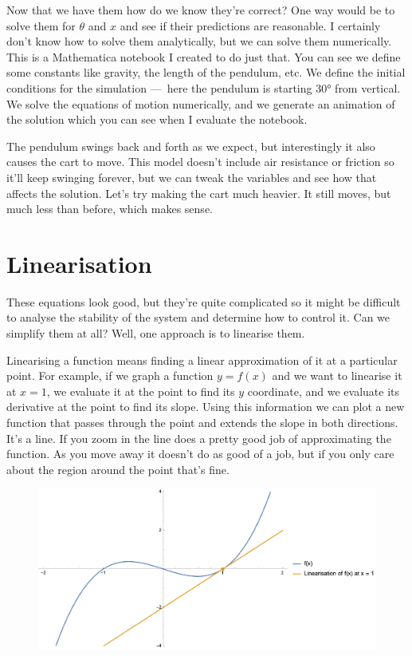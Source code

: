 \documentclass{article}
\begin{document}
Now that we have them how do we know they're correct? One way would be to solve them for $\theta$ and $x$ and see if their predictions are reasonable. I certainly don't know how to solve them analytically, but we can solve them numerically. This is a Mathematica notebook I created to do just that. You can see we define some constants like gravity, the length of the pendulum, etc. We define the initial conditions for the simulation — here the pendulum is starting $\ang{30}$ from vertical. We solve the equations of motion numerically, and we generate an animation of the solution which you can see when I evaluate the notebook.

The pendulum swings back and forth as we expect, but interestingly it also causes the cart to move. This model doesn't include air resistance or friction so it'll keep swinging forever, but we can tweak the variables and see how that affects the solution. Let's try making the cart much heavier. It still moves, but much less than before, which makes sense.

\section{Linearisation}

These equations look good, but they're quite complicated so it might be difficult to analyse the stability of the system and determine how to control it. Can we simplify them at all? Well, one approach is to linearise them.

Linearising a function means finding a linear approximation of it at a particular point. For example, if we graph a function $y = f(x)$ and we want to linearise it at $x = 1$, we evaluate it at the point to find its $y$ coordinate, and we evaluate its derivative at the point to find its slope. Using this information we can plot a new function that passes through the point and extends the slope in both directions. It's a line. If you zoom in the line does a pretty good job of approximating the function. As you move away it doesn't do as good of a job, but if you only care about the region around the point that's fine.

\begin{figure}[H]
  \centering
\includegraphics[width=\textwidth]{linearisation}
\end{figure}
\end{document}
